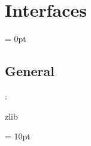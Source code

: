 
\section{Interfaces} 


\parskip = 0pt

\vspace{3mm} \subsection*{General}

: 

zlib
\vspace{2mm}

\vspace{5mm}\parskip = 10pt 
